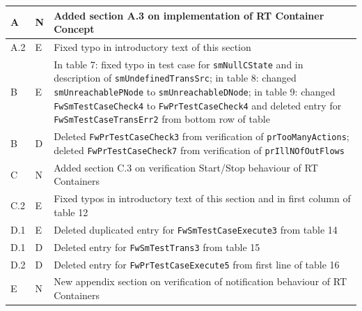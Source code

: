\documentclass[requirements]{../fwprofile}
\begin{document}
\begin{longtable}{|p{1.5cm}|p{1cm}|p{8cm}|}
\hline
A & N & Added section A.3 on implementation of RT Container Concept \\
\hline
A.2 & E & Fixed typo in introductory text of this section \\
\hline
B & E & In table 7: fixed typo in test case for \texttt{smNullCState} and in description of \texttt{smUndefinedTransSrc}; in table 8: changed \texttt{smUnreachablePNode} to \texttt{smUnreachableDNode}; in table 9: changed \texttt{FwSmTestCaseCheck4} to \texttt{FwPrTestCaseCheck4} and deleted entry for \texttt{FwSmTestCaseTransErr2} from bottom row of table \\
\hline
B & D & Deleted \texttt{FwPrTestCaseCheck3} from verification of \texttt{prTooManyActions}; deleted \texttt{FwPrTestCaseCheck7} from verification of \texttt{prIllNOfOutFlows} \\
\hline
C & N & Added section C.3 on verification Start/Stop behaviour of RT Containers \\
\hline
C.2 & E & Fixed typos in introductory text of this section and in first column of table 12\\
\hline
D.1 & E & Deleted duplicated entry for \texttt{FwSmTestCaseExecute3} from table 14 \\
\hline
D.1 & D & Deleted entry for \texttt{FwSmTestTrans3} from table 15 \\
\hline
D.2 & D & Deleted entry for \texttt{FwPrTestCaseExecute5} from first line of table 16 \\
\hline
E & N & New appendix section on verification of notification behaviour of RT Containers\\
\hline
\end{longtable}

\newpage
\end{document}
